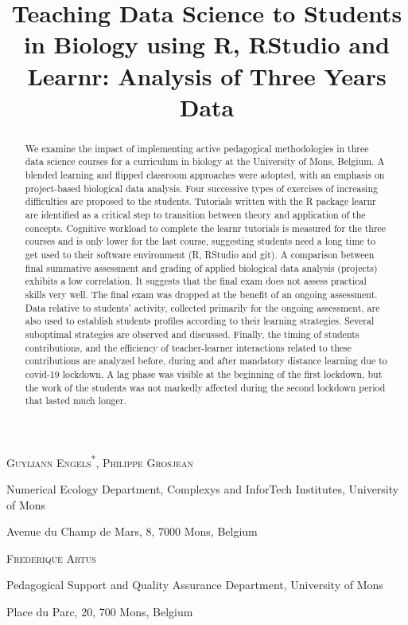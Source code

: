 \documentclass{aims}
\title[Teaching Data Science in
Biology] %
      {Teaching Data Science to Students in Biology using R, RStudio and
Learnr: Analysis of Three Years Data}
\author[Guyliann Engels, Philippe Grosjean and Frédérique Artus]{}
\theoremstyle{definition}
\begin{document}
\maketitle

\centerline{\scshape Guyliann Engels\textsuperscript{*}, Philippe Grosjean}
\medskip
{\footnotesize
 \centerline{Numerical Ecology Department, Complexys and InforTech Institutes, University of Mons}
   \centerline{Avenue du Champ de Mars, 8, 7000 Mons, Belgium}
} %

\medskip

\centerline{\scshape Frederique Artus}

\medskip
{\footnotesize
 \centerline{ Pedagogical Support and Quality Assurance Department, University of Mons}
   \centerline{Place du Parc, 20, 700 Mons, Belgium}
}

\bigskip



\begin{abstract}
   We examine the impact of implementing active pedagogical
  methodologies in three data science courses for a curriculum in
  biology at the University of Mons, Belgium. A blended learning and
  flipped classroom approaches were adopted, with an emphasis on
  project-based biological data analysis. Four successive types of
  exercises of increasing difficulties are proposed to the students.
  Tutorials written with the R package learnr are identified as a
  critical step to transition between theory and application of the
  concepts. Cognitive workload to complete the learnr tutorials is
  measured for the three courses and is only lower for the last course,
  suggesting students need a long time to get used to their software
  environment (R, RStudio and git). A comparison between final summative
  assessment and grading of applied biological data analysis (projects)
  exhibits a low correlation. It suggests that the final exam does not
  assess practical skills very well. The final exam was dropped at the
  benefit of an ongoing assessment. Data relative to students' activity,
  collected primarily for the ongoing assessment, are also used to
  establish students profiles according to their learning strategies.
  Several suboptimal strategies are observed and discussed. Finally, the
  timing of students contributions, and the efficiency of
  teacher-learner interactions related to these contributions are
  analyzed before, during and after mandatory distance learning due to
  covid-19 lockdown. A lag phase was visible at the beginning of the
  first lockdown, but the work of the students was not markedly affected
  during the second lockdown period that lasted much longer.
\end{abstract}
\end{document}

